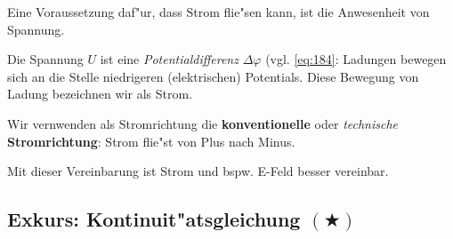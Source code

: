 \bigskip

\begin{Wichtig} 
   Eine Voraussetzung daf"ur, dass Strom flie"sen kann, ist die
   Anwesenheit von Spannung.
\end{Wichtig}
Die Spannung $U$ ist eine \emph{Potentialdifferenz} $\Delta \varphi$
(vgl. \eqref{eq:184}: Ladungen bewegen sich an die Stelle niedrigeren
(elektrischen) Potentials. Diese Bewegung von Ladung bezeichnen wir
als Strom.


\begin{Wichtig}
   Wir vernwenden als Stromrichtung die \textbf{konventionelle} oder
   \emph{technische} \textbf{Stromrichtung}:
   Strom flie"st von Plus nach Minus.
\end{Wichtig}
Mit dieser Vereinbarung ist Strom und bspw. E-Feld besser vereinbar.


\subsection{Exkurs: Kontinuit"atsgleichung $(\bigstar)$}
\label{kap_exkurs:-kontinuitatsgleichung}

